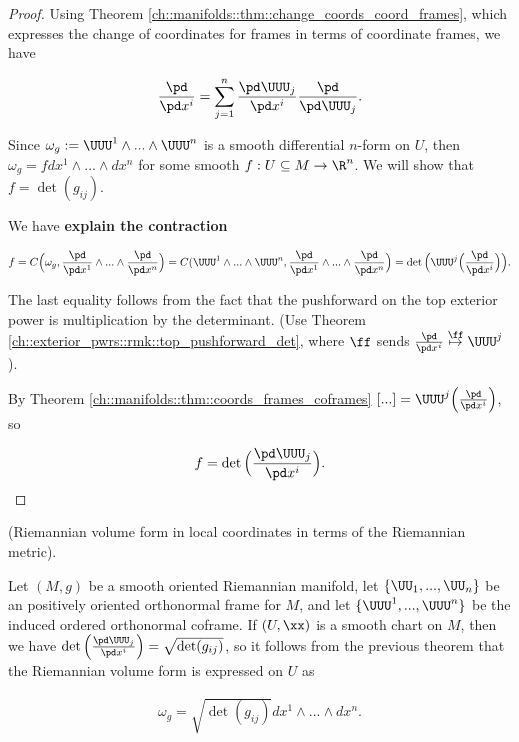 \begin{proof}
    Using Theorem \ref{ch::manifolds::thm::change_coords_coord_frames}, which expresses the change of coordinates for frames in terms of coordinate frames, we have
    
    \begin{align*}
        \frac{\pd}{\pd x^i} = \sum_{j = 1}^n \frac{\pd \UUU_j}{\pd x^i} \frac{\pd}{\pd \UUU_j}.
    \end{align*}
    
    Since $\omega_g := \UUU^1 \wedge ... \wedge \UUU^n$ is a smooth differential $n$-form on $U$, then $\omega_g = f dx^1 \wedge ... \wedge dx^n$ for some smooth $f:U \subseteq M \rightarrow \R^n$. We will show that $f = \det(g_{ij})$.
    
    We have \textbf{explain the contraction}
    
    \begin{align*}
        f = C\Big( \omega_g, \frac{\pd}{\pd x^1} \wedge ... \wedge \frac{\pd}{\pd x^n} \Big) = C(\UUU^1 \wedge ... \wedge \UUU^n, \frac{\pd}{\pd x^1} \wedge ... \wedge \frac{\pd}{\pd x^n} \Big) = \det\Big( \UUU^j \Big( \frac{\pd}{\pd x^i} \Big) \Big).
    \end{align*}
    
    The last equality follows from the fact that the pushforward on the top exterior power is multiplication by the determinant. (Use Theorem \ref{ch::exterior_pwrs::rmk::top_pushforward_det}, where $\ff$ sends $\frac{\pd}{\pd x^i} \overset{\ff}{\mapsto} \UUU^j$).

    By Theorem \ref{ch::manifolds::thm::coords_frames_coframes} $[...] = \UUU^j \Big( \frac{\pd}{\pd x^i} \Big)$, so
    
    \begin{align*}
        f = \det \Big( \frac{\pd \UUU_j}{\pd x^i} \Big).
    \end{align*}
\end{proof}

\begin{theorem}
     (Riemannian volume form in local coordinates in terms of the Riemannian metric).

    Let $(M, g)$ be a smooth oriented Riemannian manifold, let $\{\UU_1, ..., \UU_n \}$ be an positively oriented orthonormal frame for $M$, and let $\{\UUU^1, ..., \UUU^n\}$ be the induced ordered orthonormal coframe. If $(U, \xx)$ is a smooth chart on $M$, then we have $\det \Big( \frac{\pd \UUU_j}{\pd x^i} \Big) = \sqrt{\det(g_{ij})}$, so it follows from the previous theorem that the Riemannian volume form is expressed on $U$ as

    \begin{align*}
        \omega_g = \sqrt{\det(g_{ij})} dx^1 \wedge ... \wedge dx^n.
    \end{align*}
\end{theorem}

